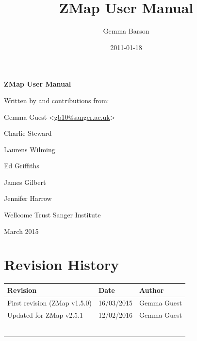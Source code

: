 \documentclass[letterpaper]{article}
\title{ZMap User Manual}
\author{Gemma Barson}
\date{2011-01-18}
\begin{document}
\setcounter{page}{1}\pagestyle{Standard}


\thispagestyle{FirstPage}
{\centering\sffamily\bfseries\color[rgb]{0.0,0.27058825,0.5254902}
\Huge\bf{ZMap User Manual}\par}

\bigskip

{\centering\large{Written by and contributions from:}\par
\large{Gemma Guest} {\textless}\href{mailto:gb10@sanger.ac.uk}{gb10@sanger.ac.uk}{\textgreater}\par
\large{Charlie Steward}\par
\large{Laurens Wilming}\par
\large{Ed Griffiths}\par
\large{James Gilbert}\par
\large{Jennifer Harrow}\par
}


\bigskip

{\centering\large{Wellcome Trust Sanger Institute}\par}
{ March 2015\par}



\clearpage
{\color[rgb]{0.0,0.27058825,0.5254902}\section[Revision History]{Revision History}}
\hypertarget{RefHeading334316266717}{}

\begin{center}
\tablehead{}
\begin{supertabular}{|m{8cm}|m{3.2849998cm}|m{3.282cm}|}
\hline
\bfseries Revision &
\bfseries Date &
\bfseries Author\\\hline
 First revision (ZMap v1.5.0) &
 16/03/2015 &
 Gemma Guest\\\hline
 Updated for ZMap v2.5.1 &
 12/02/2016 &
 Gemma Guest\\\hline
 &
 &
 \\\hline
 &
 &
 \\\hline
 &
 &
 \\\hline
 &
 &
 \\\hline
 &
 &
 \\\hline
 &
 &
 \\\hline
\end{supertabular}
\end{center}

\bigskip
\end{document}
